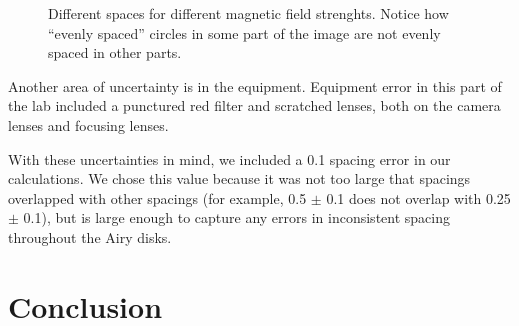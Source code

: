 \begin{figure}[ttt]
  \begin{center}
  \end{center}
  \caption{Different spaces for different magnetic field strenghts. Notice how ``evenly spaced'' circles in some part of the image are not evenly spaced in other parts.}
  \label{BadSpacing}
\end{figure}

Another area of uncertainty is in the equipment. Equipment error in this part of the lab included a punctured red filter and scratched lenses, both on the camera lenses and focusing lenses. 

With these uncertainties in mind, we included a 0.1 spacing error in our calculations. We chose this value because it was not too large that spacings overlapped with other spacings (for example, 0.5 $\pm$ 0.1 does not overlap with 0.25 $\pm$ 0.1), but is large enough to capture any errors in inconsistent spacing throughout the Airy disks.

\section{Conclusion}


